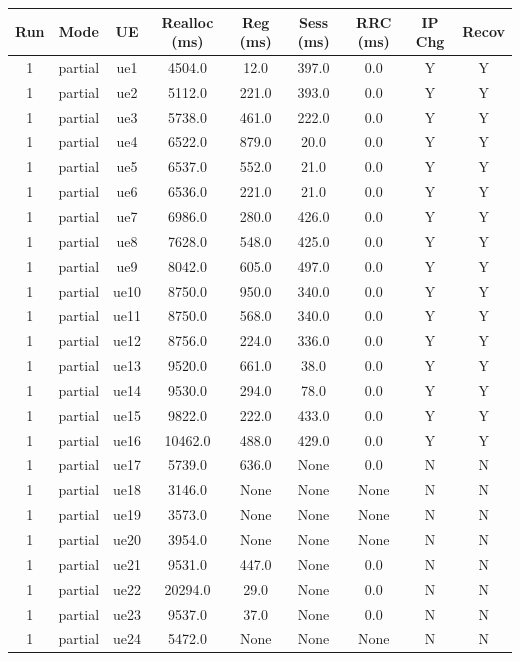 \begin{table}[ht]
\centering
\begin{tabular}{|c|c|c|c|c|c|c|c|c|}
\hline
Run & Mode & UE & Realloc (ms) & Reg (ms) & Sess (ms) & RRC (ms) & IP Chg & Recov \\
\hline
1 & partial & ue1 & 4504.0 & 12.0 & 397.0 & 0.0 & Y & Y \\
1 & partial & ue2 & 5112.0 & 221.0 & 393.0 & 0.0 & Y & Y \\
1 & partial & ue3 & 5738.0 & 461.0 & 222.0 & 0.0 & Y & Y \\
1 & partial & ue4 & 6522.0 & 879.0 & 20.0 & 0.0 & Y & Y \\
1 & partial & ue5 & 6537.0 & 552.0 & 21.0 & 0.0 & Y & Y \\
1 & partial & ue6 & 6536.0 & 221.0 & 21.0 & 0.0 & Y & Y \\
1 & partial & ue7 & 6986.0 & 280.0 & 426.0 & 0.0 & Y & Y \\
1 & partial & ue8 & 7628.0 & 548.0 & 425.0 & 0.0 & Y & Y \\
1 & partial & ue9 & 8042.0 & 605.0 & 497.0 & 0.0 & Y & Y \\
1 & partial & ue10 & 8750.0 & 950.0 & 340.0 & 0.0 & Y & Y \\
1 & partial & ue11 & 8750.0 & 568.0 & 340.0 & 0.0 & Y & Y \\
1 & partial & ue12 & 8756.0 & 224.0 & 336.0 & 0.0 & Y & Y \\
1 & partial & ue13 & 9520.0 & 661.0 & 38.0 & 0.0 & Y & Y \\
1 & partial & ue14 & 9530.0 & 294.0 & 78.0 & 0.0 & Y & Y \\
1 & partial & ue15 & 9822.0 & 222.0 & 433.0 & 0.0 & Y & Y \\
1 & partial & ue16 & 10462.0 & 488.0 & 429.0 & 0.0 & Y & Y \\
1 & partial & ue17 & 5739.0 & 636.0 & None & 0.0 & N & N \\
1 & partial & ue18 & 3146.0 & None & None & None & N & N \\
1 & partial & ue19 & 3573.0 & None & None & None & N & N \\
1 & partial & ue20 & 3954.0 & None & None & None & N & N \\
1 & partial & ue21 & 9531.0 & 447.0 & None & 0.0 & N & N \\
1 & partial & ue22 & 20294.0 & 29.0 & None & 0.0 & N & N \\
1 & partial & ue23 & 9537.0 & 37.0 & None & 0.0 & N & N \\
1 & partial & ue24 & 5472.0 & None & None & None & N & N \\

\end{tabular}
\end{table}
